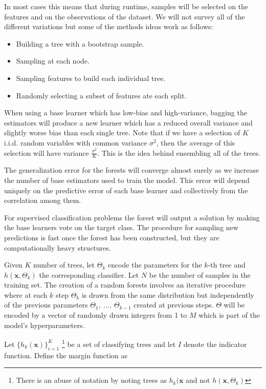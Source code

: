 	In most cases this means that during runtime, samples will be selected on the features and on the observations of the dataset. We will not survey all of the different variations but some of the methods ideas work as follows:
	
	\begin{itemize}
		\item Building a tree with a bootstrap sample.
		\item Sampling at each node.
		\item Sampling features to build each individual tree.
		\item Randomly selecting a subset of features ate each split.
	\end{itemize}

When using a base learner which has low-bias and high-variance, bagging the estimators will produce a new learner which has a reduced overall variance and slightly worse bias than each single tree. Note that if we have a selection of $K$ i.i.d. random variables with common variance $\sigma^2$, then the average of this selection will have variance $\frac{\sigma^2}{K}$. This is the idea behind ensembling all of the trees.

The generalization error for the forests will converge almost surely as we increase the number of base estimators used to train the model. This error will depend uniquely on the predictive error of each base learner and collectively from the correlation among them.

For supervised classification problems the forest will output a solution by making the base learners vote on the  target class. The procedure for sampling new predictions is fast once the forest has been constructed, but they are computationally heavy structures.

Given $K$ number of trees, let $\Theta_k$ encode the parameters for the $k$-th tree and $h(\textbf{x},\Theta_k)$ the corresponding classifier. Let $N$ be the number of samples in the training set. The creation of a random forests involves an iterative procedure where at each $k$ step $\Theta_k$ is drawn from the same distribution but independently of the previous parameters $\Theta_1, \ ..., \ \Theta_{k-1}$ created at previous steps. $\Theta$ will be encoded by a vector of randomly drawn integers from 1 to $M$ which is part of the model's hyperparameters.

Let $\{h_k(\textbf{x})\}_{i=1}^K$  \footnote{There is an abuse of notation by noting trees as $h_k(\textbf{x}$ and not $h(\textbf{x}, \Theta_k)$ } be a set of classifying trees and let $I$ denote the indicator function.  Define the margin function as

